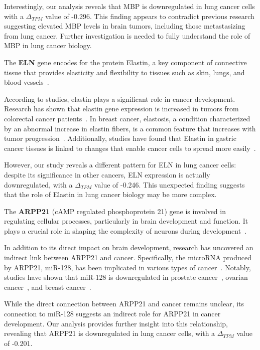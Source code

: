 Interestingly, our analysis reveals that MBP is downregulated in lung cancer cells with a $\Delta_{TPM}$ value of -0.296.
This finding appears to contradict previous research suggesting elevated MBP levels in brain tumors,
including those metastasizing from lung cancer.
Further investigation is needed to fully understand the role of MBP in lung cancer biology.
\newline

The \textbf{ELN} gene encodes for the protein Elastin,
a key component of connective tissue that provides elasticity and
flexibility to tissues such as skin, lungs, and blood vessels~\cite{Debelle1999ELN}.

According to studies, elastin plays a significant role in cancer development.
Research has shown that elastin gene expression is increased in tumors from colorectal cancer patients~\cite{Li2020ELN}.
In breast cancer, elastosis, a condition characterized by an abnormal increase in elastin fibers,
is a common feature that increases with tumor progression~\cite{Lepucki2022ELN}.
Additionally, studies have found that Elastin in gastric cancer tissues is linked to changes that enable cancer cells
to spread more easily~\cite{Fang2023ELN}.

However, our study reveals a different pattern for ELN in lung cancer cells:
despite its significance in other cancers, ELN expression is actually downregulated, with a $\Delta_{TPM}$ value of -0.246.
This unexpected finding suggests that the role of Elastin in lung cancer biology may be more complex.
\newline

The \textbf{ARPP21} (cAMP regulated phosphoprotein 21) gene is involved in regulating cellular processes,
particularly in brain development and function.
It plays a crucial role in shaping the complexity of neurons during development~\cite{Rehfeld2018ARPP21}.

In addition to its direct impact on brain development, research has uncovered an indirect link between ARPP21 and cancer.
Specifically, the microRNA produced by ARPP21, miR-128, has been implicated in various types of cancer~\cite{Li2013ARPP21}.
Notably, studies have shown that miR-128 is downregulated in prostate cancer~\cite{Khan2010ARPP21}, ovarian cancer~\cite{Woo2012ARPP21},
and breast cancer~\cite{Zhu2011ARPP21}.

While the direct connection between ARPP21 and cancer remains unclear,
its connection to miR-128 suggests an indirect role for ARPP21 in cancer development.
Our analysis provides further insight into this relationship, revealing that ARPP21 is downregulated in lung cancer cells,
with a $\Delta_{TPM}$ value of -0.201.
\newline

